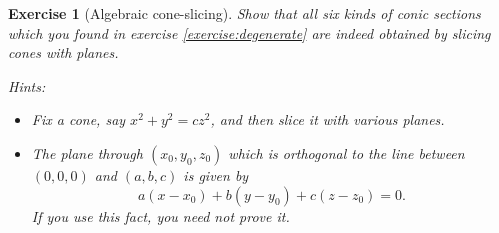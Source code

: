 \documentclass[a4paper,leqno,9pt]{article}
\theoremstyle{exercise}
\newtheorem{exercise}{Exercise}
\theoremstyle{plain}
\theoremstyle{definition}
\begin{document}
\begin{exercise}[Algebraic cone-slicing]
  Show that all six kinds of conic sections which you found in exercise \ref{exercise:degenerate} are indeed obtained by
  slicing cones with planes.

  \textit{Hints:}
  \begin{itemize}
    \item Fix a cone, say $ x^2 + y^2 = cz^2 $, and then slice it with various planes.
    \item The plane through $ (x_0, y_0, z_0) $ which is orthogonal to the line between $ (0,0,0) $ and $ (a,b,c) $ is given by
          \begin{displaymath}
            a(x-x_0) + b(y-y_0) + c(z-z_0) = 0.
          \end{displaymath}
          If you use this fact, you need not prove it.
  \end{itemize}
\end{exercise}
\end{document}

